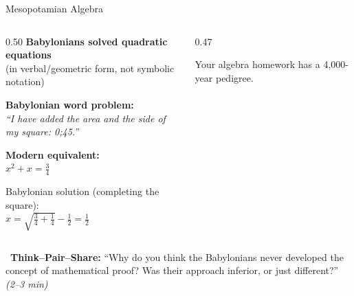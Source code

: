 \begin{frame}[shrink=11]{Mesopotamian Algebra}

  \begin{columns}[T]
    \begin{column}{0.50\textwidth}
      \textbf{Babylonians solved quadratic equations}\\[0.3em]
      {\small (in verbal/geometric form, not symbolic notation)}

      \vspace{0.6em}
      \textbf{Babylonian word problem:}\\
      {\small\itshape ``I have added the area and the side of my square: 0;45.''}

      \vspace{0.5em}
      \textbf{Modern equivalent:}\\
      $x^2 + x = \frac{3}{4}$

      \vspace{0.5em}
      {\small Babylonian solution (completing the square):}\\
      $x = \sqrt{\frac{3}{4} + \frac{1}{4}} - \frac{1}{2} = \frac{1}{2}$
    \end{column}

    \begin{column}{0.47\textwidth}

      \vspace{0.5em}
      \begin{insightbox}
        Your algebra homework has a 4,000-year pedigree.
      \end{insightbox}
    \end{column}
  \end{columns}

  \vspace{0.3em}
  \begin{center}
    \colorbox{accentOrange!15}{\parbox{0.85\textwidth}{\centering\small
      \faUsers\ \textbf{Think--Pair--Share:} ``Why do you think the Babylonians never developed
      the concept of mathematical proof? Was their approach inferior, or just different?'' \emph{(2--3 min)}
    }}
  \end{center}

\end{frame}

